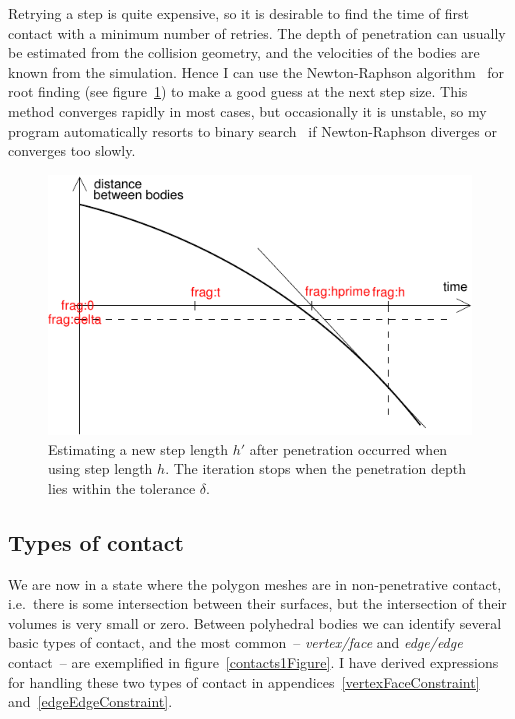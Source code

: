 Retrying a step is quite expensive, so it is desirable to find the time of first contact with a
minimum number of retries. The depth of penetration can usually be estimated from the collision
geometry, and the velocities of the bodies are known from the simulation. Hence I can use the
Newton-Raphson algorithm~\cite{NRinC} for root finding (see figure~\ref{collisionTime}) to make
a good guess at the next step size. This method converges rapidly in most cases, but
occasionally it is unstable, so my program automatically resorts to binary
search~\cite{Sedgewick:83} if Newton-Raphson diverges or converges too slowly.

\begin{figure}
\centerline{\includegraphics{figures/coll-time}}
\caption{Estimating a new step length $h'$ after penetration occurred when using step length $h$.
    The iteration stops when the penetration depth lies within the tolerance $\delta$.
    \label{collisionTime}}
\end{figure}

\subsection{Types of contact}

We are now in a state where the polygon meshes are in non-penetrative contact, i.e.\ there is some
intersection between their surfaces, but the intersection of their volumes is very small or zero.
Between polyhedral bodies we can identify several basic types of contact, and the most common~--
\emph{vertex/face} and \emph{edge/edge} contact~-- are exemplified in figure~\ref{contacts1Figure}.
I have derived expressions for handling these two types of contact in
appendices~\ref{vertexFaceConstraint} and~\ref{edgeEdgeConstraint}.

